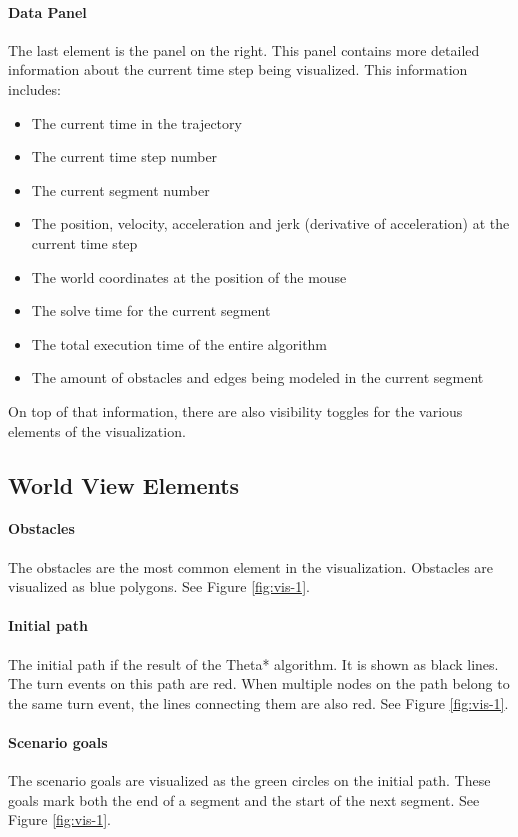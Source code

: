 \paragraph{Data Panel} The last element is the panel on the right. This panel contains more detailed information about the current time step being visualized. This information includes:
\begin{itemize}
\item The current time in the trajectory
\item The current time step number
\item The current segment number
\item The position, velocity, acceleration and jerk (derivative of acceleration) at the current time step
\item The world coordinates at the position of the mouse
\item The solve time for the current segment
\item The total execution time of the entire algorithm
\item The amount of obstacles and edges being modeled in the current segment
\end{itemize}
On top of that information, there are also visibility toggles for the various elements of the visualization.

\subsection{World View Elements}
\paragraph{Obstacles} The obstacles are the most common element in the visualization. Obstacles are visualized as blue polygons. See Figure \ref{fig:vis-1}.
\paragraph{Initial path} The initial path if the result of the Theta* algorithm. It is shown as black lines. The turn events on this path are red. When multiple nodes on the path belong to the same turn event, the lines connecting them are also red. See Figure \ref{fig:vis-1}.
\paragraph{Scenario goals} The scenario goals are visualized as the green circles on the initial path. These goals mark both the end of a segment and the start of the next segment. See Figure \ref{fig:vis-1}.

